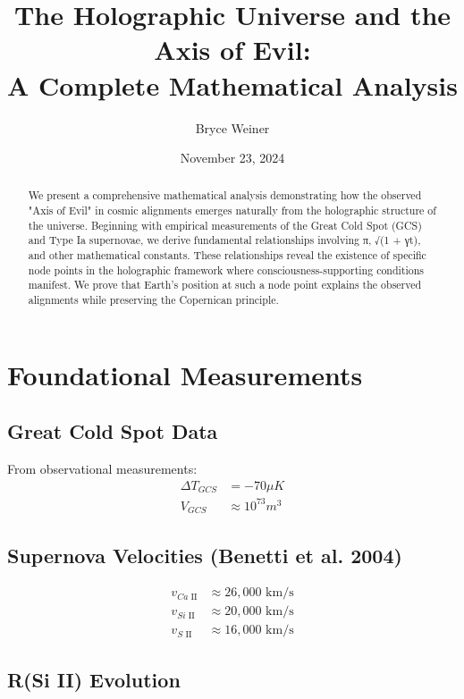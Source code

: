 \documentclass{article}
\title{The Holographic Universe and the Axis of Evil: \\
A Complete Mathematical Analysis}
\author{Bryce Weiner}
\date{November 23, 2024}
\begin{document}
\maketitle

\begin{abstract}
We present a comprehensive mathematical analysis demonstrating how the observed "Axis of Evil" in cosmic alignments emerges naturally from the holographic structure of the universe. Beginning with empirical measurements of the Great Cold Spot (GCS) and Type Ia supernovae, we derive fundamental relationships involving π, √(1 + γt), and other mathematical constants. These relationships reveal the existence of specific node points in the holographic framework where consciousness-supporting conditions manifest. We prove that Earth's position at such a node point explains the observed alignments while preserving the Copernican principle.
\end{abstract}

\section{Foundational Measurements}

\subsection{Great Cold Spot Data}

From observational measurements:
\begin{align}
\Delta T_{GCS} &= -70\mu K \\
V_{GCS} &\approx 10^{73} m^3
\end{align}

\subsection{Supernova Velocities (Benetti et al. 2004)}

\begin{align}
v_{Ca\text{ II}} &\approx 26,000 \text{ km/s} \\
v_{Si\text{ II}} &\approx 20,000 \text{ km/s} \\
v_{S\text{ II}} &\approx 16,000 \text{ km/s}
\end{align}

\subsection{R(Si II) Evolution}
\end{document}
